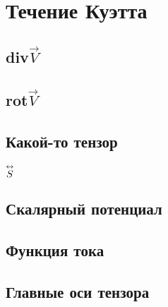 \section{Течение Куэтта}

\subsection{div$\vec{V}$}

\subsection{rot$\vec{V}$}

\subsection{Какой-то тензор}
$\overset{\leftrightarrow}{S}$

\subsection{Скалярный потенциал}

\subsection{Функция тока}

\subsection{Главные оси тензора}
